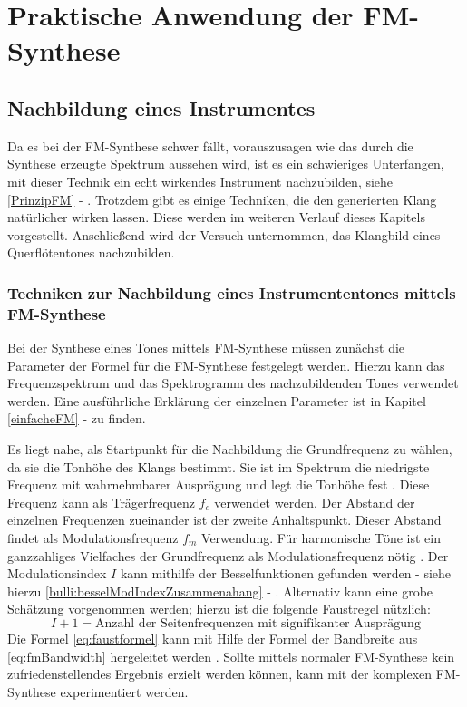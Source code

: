 \section{Praktische Anwendung der FM-Synthese}
\FloatBarrier
\subsection{Nachbildung eines Instrumentes}
Da es bei der FM-Synthese schwer fällt, vorauszusagen wie das durch die Synthese erzeugte Spektrum aussehen wird, ist es ein schwieriges Unterfangen, mit dieser Technik ein echt wirkendes Instrument nachzubilden, siehe \ref{PrinzipFM} - .
Trotzdem gibt es einige Techniken, die den generierten Klang natürlicher wirken lassen. Diese werden im weiteren Verlauf dieses Kapitels vorgestellt. Anschließend wird der Versuch unternommen, das Klangbild eines Querflötentones nachzubilden.

\FloatBarrier
\subsubsection{Techniken zur Nachbildung eines Instrumententones mittels FM-Synthese}

Bei der Synthese eines Tones mittels FM-Synthese müssen zunächst die Parameter der Formel für die FM-Synthese festgelegt werden. Hierzu kann das Frequenzspektrum und das Spektrogramm des nachzubildenden Tones verwendet werden. Eine ausführliche Erklärung der einzelnen Parameter ist in Kapitel \ref{einfacheFM} -  zu finden. 

Es liegt nahe, als Startpunkt für die Nachbildung die Grundfrequenz zu wählen, da sie die Tonhöhe des Klangs bestimmt. Sie ist im Spektrum die niedrigste Frequenz mit wahrnehmbarer Ausprägung und legt die Tonhöhe fest \cite[S. 53]{barkowsky}. Diese Frequenz kann als Trägerfrequenz $f_c$ verwendet werden. Der Abstand der einzelnen Frequenzen zueinander ist der zweite Anhaltspunkt. Dieser Abstand findet als Modulationsfrequenz $f_m$ Verwendung. Für harmonische Töne ist ein ganzzahliges Vielfaches der Grundfrequenz als Modulationsfrequenz nötig \cite[S. 528]{chowningPaper}. Der Modulationsindex $I$ kann mithilfe der Besselfunktionen gefunden werden - siehe hierzu \ref{bulli:besselModIndexZusammenahang} - . Alternativ kann eine grobe Schätzung vorgenommen werden; hierzu ist die folgende Faustregel nützlich:
\begin{equation}
\label{eq:faustformel}
I + 1 = \text{Anzahl der Seitenfrequenzen mit signifikanter Ausprägung}
\end{equation}
Die Formel \ref{eq:faustformel} kann mit Hilfe der Formel der Bandbreite aus \ref{eq:fmBandwidth} hergeleitet werden \cite[S. 221]{lathi}. Sollte mittels normaler FM-Synthese kein zufriedenstellendes Ergebnis erzielt werden können, kann mit der komplexen FM-Synthese experimentiert werden. 

